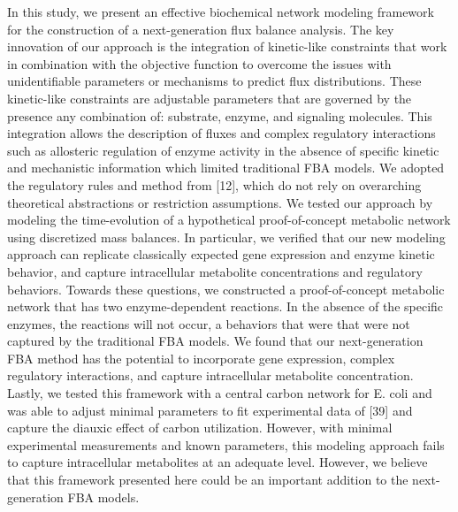 \documentclass[12pt]{article}
\begin{document}
In this study, we present an effective biochemical network modeling framework for the construction of a next-generation flux balance analysis. The key innovation of our approach is the integration of kinetic-like constraints that work in combination with the objective function to overcome the issues with unidentifiable parameters or mechanisms to predict flux distributions. These kinetic-like constraints are adjustable parameters that are governed by the presence any combination of: substrate, enzyme, and signaling molecules. This integration allows the description of fluxes and complex regulatory interactions such as allosteric regulation of enzyme activity in the absence of specific kinetic and mechanistic information which limited traditional FBA models. We adopted the regulatory rules and method from [12], which do not rely on overarching theoretical abstractions or restriction assumptions. We tested our approach by modeling the time-evolution of a hypothetical proof-of-concept metabolic network using discretized mass balances. In particular, we verified that our new modeling approach can replicate classically expected gene expression and enzyme kinetic behavior, and capture intracellular metabolite concentrations and regulatory behaviors. Towards these questions, we constructed a proof-of-concept metabolic network that has two enzyme-dependent reactions. In the absence of the specific enzymes, the reactions will not occur, a behaviors that were   that were not captured by the traditional FBA models. We found that our next-generation FBA method has the potential to incorporate gene expression, complex regulatory interactions, and capture intracellular metabolite concentration. Lastly, we tested this framework with a central carbon network for E. coli and was able to adjust minimal parameters to fit experimental data of [39] and capture the diauxic effect of carbon utilization. However, with minimal experimental measurements and known parameters, this modeling approach fails to capture intracellular metabolites at an adequate level. However, we believe that this framework presented here could be an important addition to the next-generation FBA models. 

\end{document}
